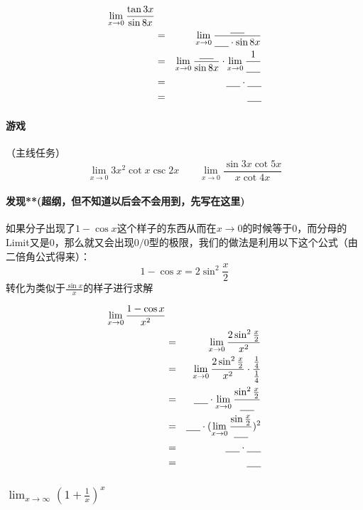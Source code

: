 \documentclass[UTF8]{ctexart}
\begin{document}
\begin{eqnarray*}
{\lim_{x \to 0} \frac{\tan{3x}}{\sin{8x}}}\\
& = & {\lim_{x \to 0} \frac{\underline{\hbox to 5mm{}}}{\underline{\hbox to 5mm{}} \cdot \sin{8x}}}\\
& = & {\lim_{x \to 0} \frac{\underline{\hbox to 5mm{}}}{\sin{8x}}} \cdot {\lim_{x \to 0} \frac{1}{\underline{\hbox to 5mm{}}}}\\
& = & \underline{\hbox to 5mm{}} \cdot \underline{\hbox to 5mm{}}\\
& = & \underline{\hbox to 5mm{}}
\end{eqnarray*}

\paragraph{游戏}
（主线任务）
\[ {\lim_{x \to 0} 3x^2 \cot{x} \csc{2x}}   \qquad {\lim_{x \to 0} \frac{\sin{3x}\cot{5x}}{x\cot{4x}}}\]

\paragraph{发现**(超纲，但不知道以后会不会用到，先写在这里)}
如果分子出现了$1-\cos{x}$这个样子的东西从而在$x \to 0$的时候等于0，而分母的Limit又是0，那么就又会出现$0/0$型的极限，我们的做法是利用以下这个公式（由二倍角公式得来）：
\[1-\cos{x} = 2\sin^2{\frac{x}{2}}\]
转化为类似于$\frac{\sin{x}}{x}$的样子进行求解

\begin{eqnarray*}
{\lim_{x \to 0} \frac{1-\cos{x}}{x^2}}\\
& = & {\lim_{x \to 0} \frac{2\sin^2{\frac{x}{2}}}{x^2}}\\
& = & {\lim_{x \to 0} \frac{2\sin^2{\frac{x}{2}}}{x^2} \cdot \frac{\frac{1}{4}}{\frac{1}{4}}}\\
& = & \underline{\hbox to 5mm{}} \cdot {\lim_{x \to 0} \frac{\sin^2{\frac{x}{2}}}{\underline{\hbox to 5mm{}}}}\\
& = & \underline{\hbox to 5mm{}} \cdot ({\lim_{x \to 0} \frac{\sin{\frac{x}{2}}}{\underline{\hbox to 5mm{}}}})^2\\
& = &\underline{\hbox to 5mm{}} \cdot \underline{\hbox to 5mm{}}\\
& = &\underline{\hbox to 5mm{}}
\end{eqnarray*}

\subsubsection{${\lim_{x \to \infty} (1 + \frac{1}{x})^x}$}
\end{document}
